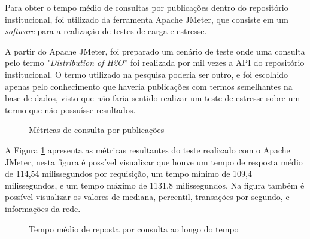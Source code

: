 Para obter o tempo médio de consultas por publicações dentro do repositório
institucional, foi utilizado da ferramenta Apache JMeter, que consiste em um
\emph{software} para a realização de testes de carga e estresse.

A partir do Apache JMeter, foi preparado um cenário de teste onde uma consulta
pelo termo "\emph{Distribution of H2O}'' foi realizada por mil vezes a API do
repositório institucional. O termo utilizado na pesquisa poderia ser outro, e
foi escolhido apenas pelo conhecimento que haveria publicações com termos semelhantes
na base de dados, visto que não faria sentido realizar um teste de estresse sobre um termo
que não possuísse resultados.

\begin{figure}[H]
    \caption{Métricas de consulta por publicações}
    \label{fig:matrics-advanced-search}
\end{figure}

A Figura \ref{fig:matrics-advanced-search} apresenta as métricas resultantes do teste
realizado com o Apache JMeter, nesta figura é possível visualizar que houve um tempo de
resposta médio de 114,54 milissegundos por requisição, um tempo mínimo de 109,4
milissegundos, e um tempo máximo de 1131,8 milissegundos. Na figura também é possível
visualizar os valores de mediana, percentil, transações por segundo, e informações da
rede.

\begin{figure}[H]
    \caption{Tempo médio de reposta por consulta ao longo do tempo}
    \centering
    \label{fig:search-response-over-time}
\end{figure}

